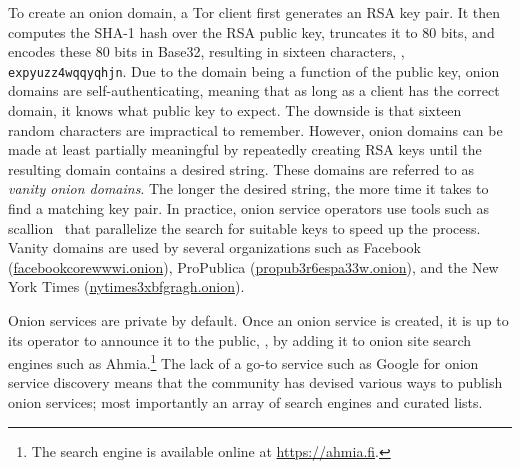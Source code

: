 To create an onion domain, a Tor client first generates an RSA key pair.  It
then computes the SHA-1 hash over the RSA public key, truncates it to 80 bits,
and encodes these 80 bits in Base32, resulting in sixteen characters, \eg,
\texttt{expyuzz4wqqyqhjn}.  Due to the domain being a function of the public
key, onion domains are self-authenticating, meaning that as long as a client has
the correct domain, it knows what public key to expect.  The downside is that
sixteen random characters are impractical to remember.  However, onion domains
can be made at least partially meaningful by repeatedly creating RSA keys until
the resulting domain contains a desired string.  These domains are referred to
as \emph{vanity onion domains}.  The longer the desired string, the more time it
takes to find a matching key pair.  In practice, onion service operators use
tools such as scallion~\cite{scallion} that parallelize the search for suitable
keys to speed up the process.  Vanity domains are used by several organizations
such as Facebook (\url{facebookcorewwwi.onion}), ProPublica
(\url{propub3r6espa33w.onion}), and the New York Times
(\url{nytimes3xbfgragh.onion}).

Onion services are private by default.  Once an onion service is created, it is
up to its operator to announce it to the public, \eg, by adding it to onion site
search engines such as Ahmia.\footnote{The search engine is available online at
\url{https://ahmia.fi}.}  The lack of a go-to service such as Google for
onion service discovery means that the community has devised various ways to
publish onion services; most importantly an array of search engines and curated
lists.
